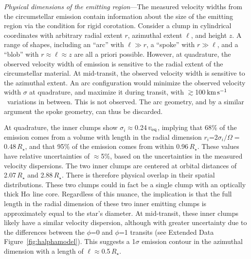 \documentclass{nature3}
\newcommand{\kms}{\ensuremath{\rm km\,s^{-1}}}
\begin{document}
\begin{methods}
{\it Physical dimensions of the emitting region}---The measured
velocity widths from the circumstellar emission contain information
about the size of the emitting region via the condition for rigid
corotation.  Consider a clump in cylindrical coordinates with
arbitrary radial extent $r$, azimuthal extent $\ell$, and height $z$.
A range of shapes, including an ``arc'' with $\ell \gg r$, a ``spoke''
with $r \gg \ell$, and a ``blob'' with $r \approx \ell \approx z$ are
all a priori possible.  However, at quadrature, the observed velocity
width of emission is sensitive to the radial extent of the
circumstellar material.  At mid-transit, the observed velocity width
is sensitive to the azimuthal extent.  An arc configuration would
minimize the observed velocity width $\sigma$ at quadrature, and
maximize it during transit, with $\gtrsim$100\,\kms\ variations in
between.  This is not observed.   The arc geometry, and by a similar
argument the spoke geometry, can thus be discarded.  

At quadrature, the inner clumps show $\sigma_i$$\approx$0.24\,$v_{\rm
eq}$, implying that 68\% of the emission comes from a volume with
length in the radial dimension $r_i$=$2\sigma_i /
\Omega$$=$0.48\,$R_\star$, and that 95\% of the emission comes from
within 0.96\,$R_\star$.  These values have relative uncertainties of
$\approx$5\%, based on the uncertainties in the measured velocity
dispersions.  The two inner clumps are centered at orbital distances
of 2.07\,$R_\star$ and 2.88\,$R_\star$.  There is therefore physical
overlap in their spatial distributions.  These two clumps could in
fact be a single clump with an optically thick H$\alpha$ line core.
Regardless of this nuance, the implication is that the full length in
the radial dimension of these two inner emitting clumps is
approximately equal to the star's diameter.  At mid-transit, these
inner clumps likely have a similar velocity dispersion, although with
greater uncertainty due to the differences between the $\phi$=0 and
$\phi$=1 transits (see Extended Data Figure~\ref{fig:halphamodel}).
This suggests a 1$\sigma$ emission contour in the azimuthal dimension
with a length of $\ell$$\approx$0.5\,$R_\star$.


\end{methods}
\end{document}
